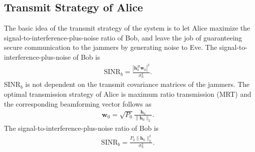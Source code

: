 \documentclass[conference]{IEEEtran}
\begin{document}
\subsection{Transmit Strategy of Alice}
The basic idea of the transmit strategy of the system is to let Alice maximize the signal-to-interference-plus-noise ratio of Bob, and leave the job of guaranteeing secure communication to the jammers by generating noise to Eve.  The signal-to-interference-plus-noise of Bob is 
\begin{eqnarray}
\mathrm{SINR}_b= \frac{\left| \mathbf{h}_{0}^H\mathbf{w}_{0}\right|^2}{\sigma_n^2 }. 
\end{eqnarray}
$\mathrm{SINR}_b$ is not dependent on the transmit covariance matrices of the jammers. The optimal transmission strategy of Alice is maximum ratio transmission (MRT) and the corresponding beamforming vector follows as
\begin{eqnarray}
\mathbf{w}_0 = \sqrt{P_0}\frac{\mathbf{h}_0}{\|\mathbf{h}_0\|_2} \label{eq:optimal_w}.
\end{eqnarray}
The signal-to-interference-plus-noise ratio of Bob is
\begin{eqnarray} 
\mathrm{SINR}_b= \frac{P_0\| \mathbf{h}_{0}\|_2^2}{\sigma_n^2 }.  \label{eq:SINR_b}
\end{eqnarray}
\end{document}
